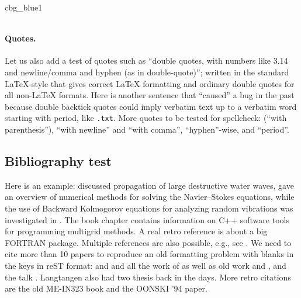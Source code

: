 \documentclass[%
oneside,                 %
final,                   %
10pt]{article}
\newenvironment{_cod_tight}[1]{
   \def\FrameCommand{\colorbox{#1}}
   \FrameRule0.6pt\MakeFramed {\FrameRestore}\vskip3mm}
   {\vskip0mm\endMakeFramed}
\newenvironment{cod}[1]{
\bgroup\rmfamily
\fboxsep=0mm\relax
\begin{_cod_tight}{#1}
\list{}{\parsep=-2mm\parskip=0mm\topsep=0pt\leftmargin=2mm
\rightmargin=2\leftmargin\leftmargin=4pt\relax}
\item\relax}
{\endlist\end{_cod_tight}\egroup}
\newenvironment{doconceexercise}{}{}
\newcounter{doconceexercisecounter}
\theoremstyle{definition}
\begin{document}
\begin{enumerate}
\begin{cod}{cbg_blue1}
\begin{lstlisting}[language=Python,style=myspeciallststyle,numbers=left,numberstyle=\tiny,stepnumber=3,numbersep=15pt,xleftmargin=1mm]
\end{lstlisting}\end{cod}
\noindent

\paragraph{Quotes.}
Let us also add a test of quotes such as ``double quotes, with numbers
like 3.14 and newline/comma and hyphen (as in double-quote)''; written
in the standard LaTeX-style that gives correct {\LaTeX} formatting and
ordinary double quotes for all non-LaTeX formats.  Here is another
sentence that ``caused'' a bug in the past because double backtick
quotes could imply verbatim text up to a verbatim word starting with
period, like \texttt{.txt}.
More quotes to be tested for spellcheck:
(``with parenthesis''), ``with newline''
and ``with comma'', ``hyphen''-wise, and ``period''.
\subsection{Bibliography test}
Here is an example: \cite{Langtangen_Pedersen_2002} discussed propagation of
large destructive water waves, \cite{Langtangen_et_al_2002} gave
an overview of numerical methods for solving the Navier--Stokes equations,
while the use of Backward Kolmogorov equations for analyzing
random vibrations was investigated in \cite{Langtangen_1994a}.
The book chapter \cite{Mardal_et_al_2003a} contains information on
C++ software tools for programming multigrid methods. A real retro
reference is \cite{Langtangen_1988d} about a big FORTRAN package.
Multiple references are also possible, e.g., see
\cite{Langtangen_Pedersen_2002,Mardal_et_al_2003a}.
We need to cite more than 10 papers to reproduce an old formatting
problem with blanks in the keys in reST format:
\cite{Langtangen_1992c,Langtangen_1994a,Mortensen_et_al_2011,Langtangen_Pedersen_2002}
and
\cite{Langtangen_et_al_2002,Glimsdal_et_al_20006,Rahman_et_al_2006b,Haga_et_al_2011a,Langtangen_2003a,Langtangen_2008a,Langtangen:95}
and all the work of
\cite{Langtangen_2012,Mardal_et_al_2003a,Jeberg_et_al_2004} as well as
old work \cite{Langtangen_1988d} and \cite{Langtangen_1989e}, and the
talk \cite{Langtangen_talk_2007a}.
Langtangen also had two thesis \cite{Langtangen:85,Langtangen_1989e}
back in the days.
More retro citations are
the old ME-IN323 book \cite{Langtangen:91} and the
\cite{Langtangen:94b} OONSKI '94 paper.
\begin{doconceexercise}
                             

\end{doconceexercise}
\end{enumerate}
\end{document}
